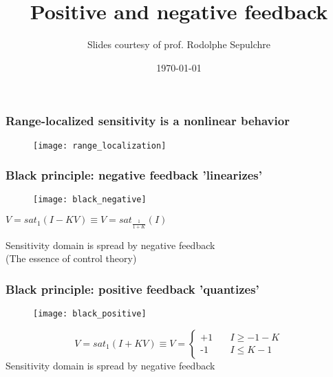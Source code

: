 \documentclass{beamer}
\title[Introduction]{Positive and negative feedback}
\author{Slides courtesy of prof. Rodolphe Sepulchre}
\date{\today}
\begin{document}
\begin{frame}
\titlepage
\end{frame}


\begin{frame}
\frametitle{Range-localized sensitivity is a nonlinear behavior}
\begin{figure}
\texttt{[image: range\_localization]}
\end{figure}
\end{frame}


\begin{frame}
\frametitle{Black principle: negative feedback 'linearizes'}
\begin{figure}
\texttt{[image: black\_negative]}
\end{figure}
\begin{center}
$V = sat_{1}(I - KV) \equiv V = sat_{\frac{1}{1+K}}(I)$\\
\end{center}
\medskip
Sensitivity domain is spread by negative feedback\\
(The essence of control theory)
\end{frame}


\begin{frame}
\frametitle{Black principle: positive feedback 'quantizes'}
\begin{figure}
\texttt{[image: black\_positive]}
\end{figure}
\[   
V =  sat_{1}(I + KV) \equiv V =
     \begin{cases}
       \mbox{+1} &\quad \text{$I \geq -1-K$}\\
       \mbox{-1} &\quad \text{$I \leq K-1$}\
     \end{cases}
\]
Sensitivity domain is spread by negative feedback\\
$\;$
\end{frame}

\end{document}
